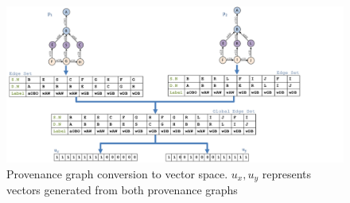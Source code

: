 \begin{figure}
\begin{center}
\includegraphics[width=\textwidth]{picture13_edit_1.pdf}
\end{center}
\caption{Provenance graph conversion to vector space. $u_x, u_y$ represents vectors generated from both provenance graphs}
\label{prov_vector}
\end{figure}








 




